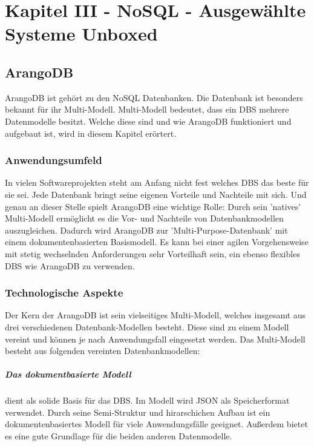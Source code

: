 \chapter{Kapitel III - NoSQL - Ausgewählte Systeme Unboxed}
\setcounter{section}{7}
\section{ArangoDB}
ArangoDB ist gehört zu den \ac{NoSQL} Datenbanken. Die Datenbank ist besonders bekannt für ihr Multi-Modell. Multi-Modell bedeutet, dass ein \ac{DBS} mehrere Datenmodelle besitzt. Welche diese sind und wie ArangoDB funktioniert und aufgebaut ist, wird in diesem Kapitel erörtert.
\subsection{Anwendungsumfeld}
In vielen Softwareprojekten steht am Anfang nicht fest welches \ac{DBS} das beste für sie sei. Jede Datenbank bringt seine eigenen Vorteile und Nachteile mit sich. Und genau an dieser Stelle spielt ArangoDB eine wichtige Rolle:
Durch sein ’natives’ Multi-Modell ermöglicht es die Vor- und Nachteile von Datenbankmodellen auszugleichen. Dadurch wird ArangoDB zur ’Multi-Purpose-Datenbank’ mit einem dokumentenbasierten Basismodell\cite{jaxenter01}. Es kann bei einer agilen Vorgehensweise mit stetig wechselnden Anforderungen sehr Vorteilhaft sein, ein ebenso flexibles DBS wie ArangoDB zu verwenden.

 \subsection{Technologische Aspekte}
Der Kern der ArangoDB ist sein vielseitiges Multi-Modell, welches insgesamt aus drei verschiedenen Datenbank-Modellen besteht. Diese sind zu einem Modell vereint und können je nach Anwendungsfall eingesetzt werden. Das Multi-Modell besteht aus folgenden  vereinten Datenbankmodellen:

\paragraph{Das dokumentbasierte Modell} dient als solide Basis für das \ac{DBS}. Im Modell wird \ac{JSON} als Speicherformat verwendet. Durch seine Semi-Struktur und hirarschichen Aufbau ist  ein dokumentenbasiertes Modell für viele Anwendungsfälle geeignet\cite{AWS_doc}.  Außerdem bietet es eine gute Grundlage für die beiden anderen Datenmodelle.

